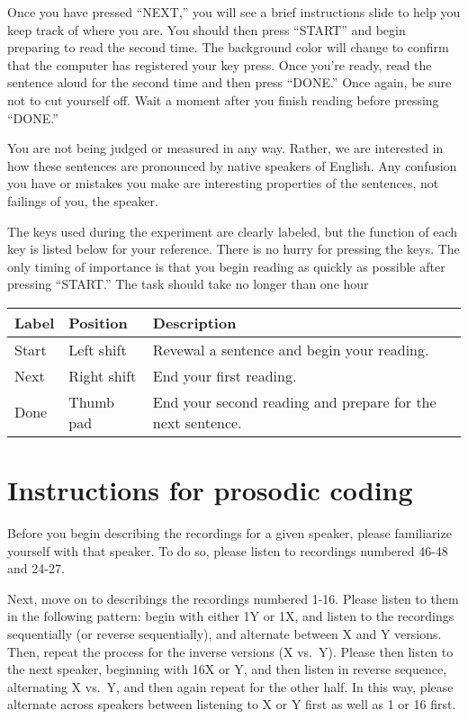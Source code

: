 \documentclass[11pt,oneside]{book}
\begin{document}
Once you have pressed ``NEXT,'' you will see a brief instructions slide to help you keep track of where you are. You should then press ``START'' and begin preparing to read the second time. The background color will change to confirm that the computer has registered your key press. Once you're ready, read the sentence aloud for the second time and then press ``DONE.'' Once again, be sure not to cut yourself off. Wait a moment after you finish reading before pressing ``DONE.''

You are not being judged or measured in any way. Rather, we are interested in how these sentences are pronounced by native speakers of English. Any confusion you have or mistakes you make are interesting properties of the sentences, not failings of you, the speaker.

The keys used during the experiment are clearly labeled, but the function of each key is listed below for your reference. There is no hurry for pressing the keys. The only timing of importance is that you begin reading as quickly as possible after pressing ``START.'' The task should take no longer than one hour

\begin{table}[!h]
\centering
\begin{tabular}{lll}
\toprule
Label & Position & Description\\
\midrule
Start & Left shift & Revewal a sentence and begin your reading.\\
Next & Right shift & End your first reading.\\
Done & Thumb pad & End your second reading and prepare for the next sentence.\\
\bottomrule
\end{tabular}
\end{table}

\newpage

\hypertarget{RA}{%
\chapter{Instructions for prosodic coding}\label{RA}}

Before you begin describing the recordings for a given speaker, please familiarize yourself with that speaker. To do so, please listen to recordings numbered 46-48 and 24-27.

Next, move on to describings the recordings numbered 1-16. Please listen to them in the following pattern: begin with either 1Y or 1X, and listen to the recordings sequentially (or reverse sequentially), and alternate between X and Y versions. Then, repeat the process for the inverse versions (X vs.~Y). Please then listen to the next speaker, beginning with 16X or Y, and then listen in reverse sequence, alternating X vs.~Y, and then again repeat for the other half. In this way, please alternate across speakers between listening to X or Y first as well as 1 or 16 first.
\end{document}
